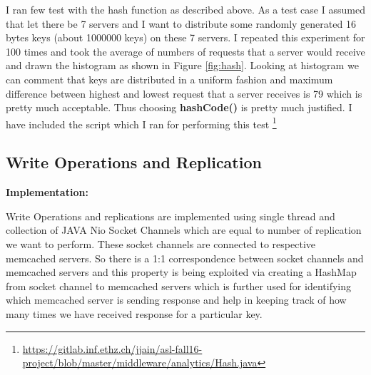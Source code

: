 \documentclass[11pt]{article}
\begin{document}
I ran few test with the hash function as described above. As a test case I assumed that let there be 7 servers and I want to distribute some randomly generated 16 bytes keys (about 1000000 keys) on these 7 servers. I repeated this experiment for 100 times and took the average of numbers of requests that a server would receive and drawn the histogram as shown in  Figure \ref{fig:hash}. Looking at histogram we can comment that keys are distributed in a uniform fashion and maximum difference between highest and lowest request that a server receives is 79 which is pretty much acceptable. Thus choosing \textbf{hashCode()} is pretty much justified. I have included the script which I ran for performing this test \footnote{\url{https://gitlab.inf.ethz.ch/jjain/asl-fall16-project/blob/master/middleware/analytics/Hash.java}}

\subsection{Write Operations and Replication}\label{sec:desc:writes}

\textbf{Implementation:}

Write Operations and replications are implemented using single thread and collection of JAVA Nio Socket Channels which are equal to number of replication we want to perform. These socket channels are connected to respective memcached servers. So there is a 1:1 correspondence between socket channels and memcached servers and this property is being exploited via creating a HashMap from socket channel to memcached servers which is further used for identifying which memcached server is sending response and help in keeping track of how many times we have received response for a particular key.  
\end{document}
